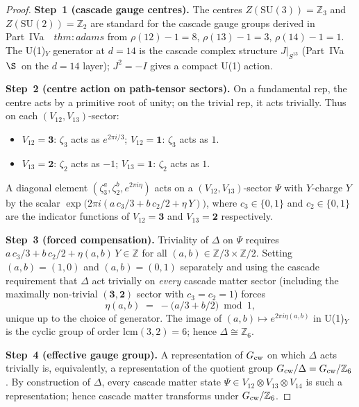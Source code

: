 \documentclass[12pt,a4paper]{article}
\begin{document}
\begin{proof}
\textbf{Step~1 (cascade gauge centres).} The centres $Z(\mathrm{SU}(3))=\mathbb{Z}_3$ and $Z(\mathrm{SU}(2))=\mathbb{Z}_2$ are standard for the cascade gauge groups derived in Part~IVa~\cite{part4a}~$\mathit{thm{:}adams}$ from $\rho(12)-1=8$, $\rho(13)-1=3$, $\rho(14)-1=1$. The U(1)$_Y$ generator at $d=14$ is the cascade complex structure $J|_{S^{13}}$ (Part~IVa~\cite{part4a}~$\S$~on the $d=14$ layer); $J^2=-I$ gives a compact U(1) action.

\textbf{Step~2 (centre action on path-tensor sectors).} On a fundamental rep, the centre acts by a primitive root of unity; on the trivial rep, it acts trivially. Thus on each $(V_{12},V_{13})$-sector:
\begin{itemize}
\item $V_{12}=\mathbf{3}$: $\zeta_3$ acts as $e^{2\pi i/3}$; $V_{12}=\mathbf{1}$: $\zeta_3$ acts as $1$.
\item $V_{13}=\mathbf{2}$: $\zeta_2$ acts as $-1$; $V_{13}=\mathbf{1}$: $\zeta_2$ acts as $1$.
\end{itemize}
A diagonal element $(\zeta_3^a,\zeta_2^b,e^{2\pi i\eta})$ acts on a $(V_{12},V_{13})$-sector $\Psi$ with $Y$-charge $Y$ by the scalar $\exp\bigl(2\pi i(a\,c_3/3+b\,c_2/2+\eta\,Y)\bigr)$, where $c_3\in\{0,1\}$ and $c_2\in\{0,1\}$ are the indicator functions of $V_{12}=\mathbf{3}$ and $V_{13}=\mathbf{2}$ respectively.

\textbf{Step~3 (forced compensation).} Triviality of $\Delta$ on $\Psi$ requires $a\,c_3/3+b\,c_2/2+\eta(a,b)\,Y\in\mathbb{Z}$ for all $(a,b)\in\mathbb{Z}/3\times\mathbb{Z}/2$. Setting $(a,b)=(1,0)$ and $(a,b)=(0,1)$ separately and using the cascade requirement that $\Delta$ act trivially on \emph{every} cascade matter sector (including the maximally non-trivial $(\mathbf{3},\mathbf{2})$ sector with $c_3=c_2=1$) forces
\[
\eta(a,b)\;=\;-\bigl(a/3+b/2\bigr)\bmod 1,
\]
unique up to the choice of generator. The image of $(a,b)\mapsto e^{2\pi i\eta(a,b)}$ in U(1)$_Y$ is the cyclic group of order $\mathrm{lcm}(3,2)=6$; hence $\Delta\cong\mathbb{Z}_6$.

\textbf{Step~4 (effective gauge group).} A representation of $G_{\rm cw}$ on which $\Delta$ acts trivially is, equivalently, a representation of the quotient group $G_{\rm cw}/\Delta=G_{\rm cw}/\mathbb{Z}_6$. By construction of $\Delta$, every cascade matter state $\Psi\in V_{12}\otimes V_{13}\otimes V_{14}$ is such a representation; hence cascade matter transforms under $G_{\rm cw}/\mathbb{Z}_6$.


\end{proof}
\end{document}
